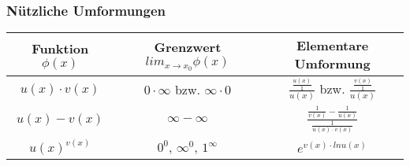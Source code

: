 \subsubsection*{Nützliche Umformungen}
\renewcommand{\arraystretch}{3}
\begin{tabular}{|c|c|c|}
\hline 
\rule[-1ex]{0pt}{2.5ex} Funktion $\phi(x)$ & Grenzwert $lim_{x \rightarrow x_0} \phi(x)$& Elementare Umformung \\ 
\hline
\rule[-1ex]{0pt}{2.5ex} $u(x) \cdot v(x)$ & $0 \cdot \infty$ bzw. $\infty \cdot 0$ & $\frac{\frac{u(x)}{1}}{u(x)}$ bzw. $\frac{\frac{v(x)}{1}}{u(x)}$ \\ 
\hline 
\rule[-1ex]{0pt}{2.5ex} $u(x) - v(x)$ &$\infty - \infty$ & $\frac{\frac{1}{v(x)}-\frac{1}{u(x)}}{\frac{1}{u(x) \cdot v(x)}}$ \\ 
\hline 
\rule[-1ex]{0pt}{2.5ex} $u(x)^{v(x)}$ & $0^0$, $\infty^0$, $1^\infty$ & $e^{v(x) \cdot ln u(x)}$ \\ 
\hline 
\end{tabular} 